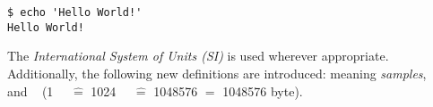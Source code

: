 \begin{lstlisting}[style=Shell]
$ echo 'Hello World!'
Hello World!
\end{lstlisting}

The \emph{International System of Units (SI)} is used wherever appropriate.
Additionally, the following new definitions are introduced: \si{\samples}
meaning \emph{samples}, \si{\mebi\byte} and \si{\kibi\byte} (\SI{1}{\mebi\byte}
$\hat{=}$ \SI{1024}{\kibi\byte} $\hat{=}$ \SI{1048576}{\byte} $=$ 1048576 byte).


